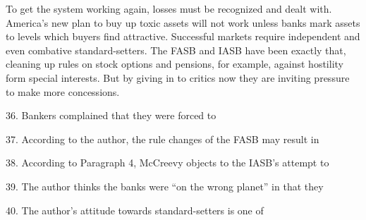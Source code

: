 \qquad To get the system working again, losses must be recognized and dealt with. America's new plan to buy up toxic assets will not work unless banks mark assets to levels which buyers find attractive. Successful markets require independent and even combative standard-setters. The FASB and IASB have been exactly that, cleaning up rules on stock options and pensions, for example, against hostility form special interests. But by giving in to critics now they are inviting pressure to make more concessions.

\vspace{6pt}

36. Bankers complained that they were forced to\par

37. According to the author, the rule changes of the FASB may result in\par

38. According to Paragraph 4, McCreevy objects to the IASB's attempt to\par

39. The author thinks the banks were ``on the wrong planet'' in that they\par

40. The author's attitude towards standard-setters is one of\par
